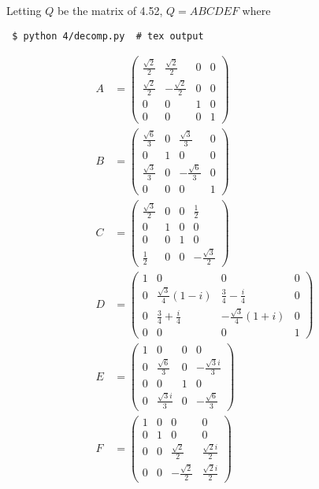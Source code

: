\begingroup
%
\par Letting $Q$ be the matrix of 4.52, $Q = ABCDEF$ where
%
\begin{verbatim} $ python 4/decomp.py  # tex output \end{verbatim}
%
\begin{align*}
A &= \begin{pmatrix} \frac{\sqrt{2}}{2} & \frac{\sqrt{2}}{2} & 0 & 0 \\ \frac{\sqrt{2}}{2} & - \frac{\sqrt{2}}{2} & 0 & 0 \\ 0 & 0 & 1 & 0 \\ 0 & 0 & 0 & 1  \end{pmatrix} \\
B &= \begin{pmatrix} \frac{\sqrt{6}}{3} & 0 & \frac{\sqrt{3}}{3} & 0 \\ 0 & 1 & 0 & 0 \\ \frac{\sqrt{3}}{3} & 0 & - \frac{\sqrt{6}}{3} & 0 \\ 0 & 0 & 0 & 1  \end{pmatrix} \\
C &= \begin{pmatrix} \frac{\sqrt{3}}{2} & 0 & 0 & \frac{1}{2} \\ 0 & 1 & 0 & 0 \\ 0 & 0 & 1 & 0 \\ \frac{1}{2} & 0 & 0 & - \frac{\sqrt{3}}{2}  \end{pmatrix} \\
D &= \begin{pmatrix} 1 & 0 & 0 & 0 \\ 0 & \frac{\sqrt{3}}{4} \left(1 - i\right) & \frac{3}{4} - \frac{i}{4} & 0 \\ 0 & \frac{3}{4} + \frac{i}{4} & - \frac{\sqrt{3}}{4} \left(1 + i\right) & 0 \\ 0 & 0 & 0 & 1  \end{pmatrix} \\
E &= \begin{pmatrix} 1 & 0 & 0 & 0 \\ 0 & \frac{\sqrt{6}}{3} & 0 & - \frac{\sqrt{3} i}{3} \\ 0 & 0 & 1 & 0 \\ 0 & \frac{\sqrt{3} i}{3} & 0 & - \frac{\sqrt{6}}{3}  \end{pmatrix} \\
F &= \begin{pmatrix} 1 & 0 & 0 & 0 \\ 0 & 1 & 0 & 0 \\ 0 & 0 & \frac{\sqrt{2}}{2} & \frac{\sqrt{2} i}{2} \\ 0 & 0 & - \frac{\sqrt{2}}{2} & \frac{\sqrt{2} i}{2}  \end{pmatrix}
\end{align*}
%
\endgroup
